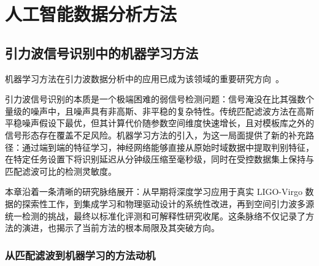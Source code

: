 \pagestyle{mystyle}

\part{人工智能数据分析方法}

\renewcommand{\parttitle}{人工智能数据分析方法}

\chapter{引力波信号识别中的机器学习方法}

机器学习方法在引力波数据分析中的应用已成为该领域的重要研究方向~\cite{Cuoco2021MLreview}。




引力波信号识别的本质是一个极端困难的弱信号检测问题：信号淹没在比其强数个量级的噪声中，且噪声具有非高斯、非平稳的复杂特性。传统匹配滤波方法在高斯平稳噪声假设下最优，但其计算代价随参数空间维度快速增长，且对模板库之外的信号形态存在覆盖不足风险。机器学习方法的引入，为这一局面提供了新的补充路径：通过端到端的特征学习，神经网络能够直接从原始时域数据中提取判别特征，在特定任务设置下将识别延迟从分钟级压缩至毫秒级，同时在受控数据集上保持与匹配滤波可比的检测灵敏度。

本章沿着一条清晰的研究脉络展开：从早期将深度学习应用于真实 LIGO-Virgo 数据的探索性工作，到集成学习和物理驱动设计的系统性改进，再到空间引力波多源统一检测的挑战，最终以标准化评测和可解释性研究收尾。这条脉络不仅记录了方法的演进，也揭示了当前方法的根本局限及其突破方向。

\section{从匹配滤波到机器学习的方法动机}

